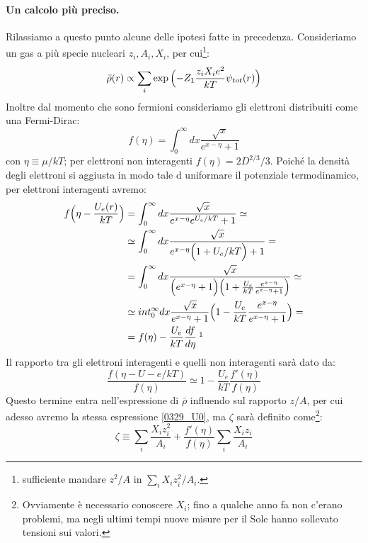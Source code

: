 \paragraph{Un calcolo più preciso.}Rilassiamo a questo punto alcune delle ipotesi fatte in precedenza. Consideriamo un gas a più specie nucleari $z_i, A_i, X_i$, per cui\footnote{ sufficiente mandare $z^2/A$ in $\sum_i X_iz^2_i/A_i$.}:
$$\bar{\rho}(r)\propto \sum_i \exp{\Bigl ( -Z_1 \frac{z_iX_i e^2}{kT}\psi_{tot}(r) \Bigr )}$$
Inoltre dal momento che sono fermioni consideriamo gli elettroni distribuiti come una Fermi-Dirac:
$$f(\eta) = \int_0^\infty dx \frac{\sqrt{x}}{e^{x-\eta}+1}$$
con $\eta \equiv \mu/kT$; per elettroni non interagenti $f(\eta) = 2D^{2/3}/3$. Poiché la densità degli elettroni si aggiusta in modo tale d uniformare il potenziale termodinamico, per elettroni interagenti avremo:
\begin{displaymath}
\begin{aligned}
f\ppc{\eta - \frac{U_e(r)}{kT}} &= \int_0^\infty dx \frac{\sqrt{x}}{e^{x-\eta}e^{U_e/kT}+1} \simeq \\
&\simeq \int_0^\infty dx \frac{\sqrt{x}}{e^{x-\eta}\ppc{1+U_e/kT}+1} =\\
&= \int_0^\infty dx \frac{\sqrt{x}}{\ppc{e^{x-\eta}+1}\ppc{1+\frac{U_e}{kT}\frac{e^{x-\eta}}{e^{x-\eta}+1}}}\simeq \\
&\simeq int_0^\infty dx \frac{\sqrt{x}}{e^{x-\eta}+1}\ppc{1-\frac{U_e}{kT}\frac{e^{x-\eta}}{e^{x-\eta}+1}} =\\
&= f(\eta) - \frac{U_e}{kT}\frac{df}{d\eta}\:\footnotemark
\end{aligned}
\end{displaymath}
\noindent Il rapporto tra gli elettroni interagenti e quelli non interagenti sarà dato da:
$$\frac{f(\eta-U-e/kT)}{f(\eta)} \simeq 1- \frac{U_e}{kT}\frac{f'(\eta)}{f(\eta)}$$
Questo termine entra nell'espressione di $\bar{\rho}$ influendo sul rapporto $z/A$, per cui adesso avremo la stessa espressione \eqref{0329_U0}, ma $\zeta$ sarà definito come\footnote{Ovviamente è necessario conoscere $X_i$; fino a qualche anno fa non c'erano problemi, ma negli ultimi tempi nuove misure per il Sole hanno sollevato tensioni sui valori.}:
$$\zeta \equiv \sum_i\frac{X_iz_i^2}{A_i} + \frac{f'(\eta)}{f(\eta)}\sum_i\frac{X_iz_i}{A_i}$$

